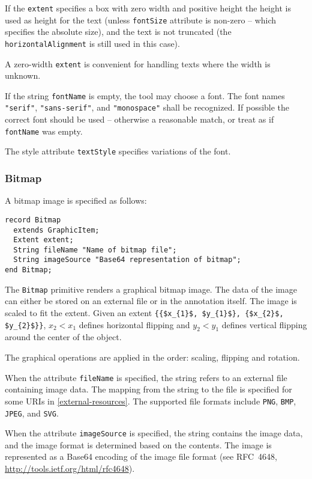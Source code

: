 If the \lstinline!extent! specifies a box with zero width and positive height the height is used as height for the text (unless \lstinline!fontSize! attribute is non-zero -- which specifies the absolute size), and the text is not truncated (the \lstinline!horizontalAlignment! is still used in this case).

\begin{nonnormative}
A zero-width \lstinline!extent! is convenient for handling texts where the width is unknown.
\end{nonnormative}

If the string \lstinline!fontName! is empty, the tool may choose a font.
The font names \lstinline!"serif"!, \lstinline!"sans-serif"!, and \lstinline!"monospace"! shall be recognized.
If possible the correct font should be used -- otherwise a reasonable match, or treat as if \lstinline!fontName! was empty.

The style attribute \lstinline!textStyle! specifies variations of the font.

\subsubsection{Bitmap}\label{bitmap}

A bitmap image is specified as follows:
\begin{lstlisting}[language=modelica]
record Bitmap
  extends GraphicItem;
  Extent extent;
  String fileName "Name of bitmap file";
  String imageSource "Base64 representation of bitmap";
end Bitmap;
\end{lstlisting}%
The \lstinline!Bitmap! primitive renders a graphical bitmap image.
The data of the image can either be stored on an external file or in the annotation itself.
The image is scaled to fit the extent.
Given an extent \lstinline!{{$x_{1}$, $y_{1}$}, {$x_{2}$, $y_{2}$}}!, $x_{2} < x_{1}$ defines horizontal flipping and $y_{2} < y_{1}$ defines vertical flipping around the center of the object.

The graphical operations are applied in the order: scaling, flipping and rotation.

When the attribute \lstinline!fileName! is specified, the string refers to an external file containing image data.
The mapping from the string to the file is specified for some URIs in \cref{external-resources}.
The supported file formats include \lstinline!PNG!, \lstinline!BMP!, \lstinline!JPEG!, and \lstinline!SVG!.

When the attribute \lstinline!imageSource! is specified, the string contains the image data, and the image format is determined based on the contents.
The image is represented as a Base64 encoding of the image file format (see RFC~4648, \url{http://tools.ietf.org/html/rfc4648}).

